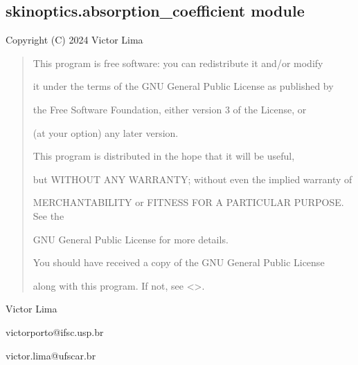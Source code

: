 \documentclass[letterpaper,10pt,english]{sphinxmanual}
\begin{document}
\sphinxstepscope


\subsection{skinoptics.absorption\_coefficient module}
\label{\detokenize{03_absorption_coefficient:module-skinoptics.absorption_coefficient}}\label{\detokenize{03_absorption_coefficient:skinoptics-absorption-coefficient-module}}\label{\detokenize{03_absorption_coefficient::doc}}
\sphinxAtStartPar
Copyright (C) 2024 Victor Lima
\begin{quote}

\begin{DUlineblock}{0em}
\item[] This program is free software: you can redistribute it and/or modify
\item[] it under the terms of the GNU General Public License as published by
\item[] the Free Software Foundation, either version 3 of the License, or
\item[] (at your option) any later version.
\end{DUlineblock}

\begin{DUlineblock}{0em}
\item[] This program is distributed in the hope that it will be useful,
\item[] but WITHOUT ANY WARRANTY; without even the implied warranty of
\item[] MERCHANTABILITY or FITNESS FOR A PARTICULAR PURPOSE.  See the
\item[] GNU General Public License for more details.
\end{DUlineblock}

\begin{DUlineblock}{0em}
\item[] You should have received a copy of the GNU General Public License
\item[] along with this program.  If not, see \textless{}\textgreater{}.
\end{DUlineblock}
\end{quote}

\begin{DUlineblock}{0em}
\item[] Victor Lima
\item[] victorporto@ifsc.usp.br
\item[] victor.lima@ufscar.br
\end{DUlineblock}
\end{document}
